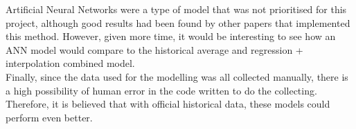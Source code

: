Artificial Neural Networks were a type of model that was not prioritised for this project, although good results had been found by other papers that implemented this method. However, given more time, it would be interesting to see how an ANN model would compare to the historical average and regression + interpolation combined model. \\

Finally, since the data used for the modelling was all collected manually, there is a high possibility of human error in the code written to do the collecting. Therefore, it is believed that with official historical data, these models could perform even better.


\clearpage